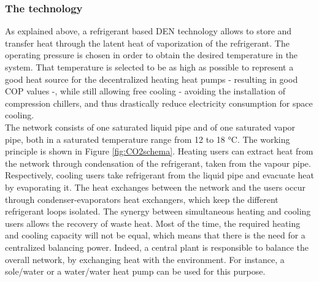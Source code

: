 \documentclass{article}
\begin{document}
\subsubsection{The technology}
As explained above, a refrigerant based DEN technology allows to store and transfer heat through the latent heat of vaporization of the refrigerant. The operating pressure is chosen in order to obtain the desired temperature in the system. That temperature is selected to be as high as possible to represent a good heat source for the decentralized heating heat pumps - resulting in good COP values -, while still allowing free cooling - avoiding the installation of compression chillers, and thus drastically reduce electricity consumption for space cooling. \\
The network consists of one saturated liquid pipe and of one saturated vapor pipe, both in a saturated temperature range from 12 to 18 \si{\celsius}\cite{suciuEnergyIntegrationCO22018}.
The working principle is shown in Figure \ref{fig:CO2schema}. Heating users can extract heat from the network through condensation of the refrigerant, taken from the vapour pipe. Respectively, cooling users take refrigerant from the liquid pipe and evacuate heat by evaporating it. The heat exchanges between the network and the users occur through condenser-evaporators heat exchangers, which keep the different refrigerant loops isolated\cite{henchozPotentialRefrigerantBased}. The synergy between simultaneous heating and cooling users allows the recovery of waste heat. Most of the time, the required heating and cooling capacity will not be equal, which means that there is the need for a centralized balancing power. Indeed, a central plant is responsible to balance the overall network, by exchanging heat with the environment. For instance, a sole/water or a water/water heat pump can be used for this purpose.\\

\end{document}
